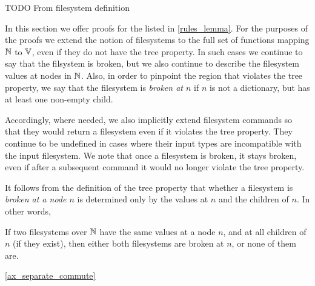 TODO From filesystem definition


In this section we offer proofs for the  listed in
\cref{rules_lemma}.
For the purposes of the proofs we extend the notion of filesystems 
to the full set of functions mapping $\mathbb{N}$ to $\mathbb{V}$, even if they
do not have the tree property.
In such cases we continue to say that the filsystem is broken,
but we also continue to describe the filesystem values at nodes in $\mathbb{N}$.
Also, in order to pinpoint the region that violates the tree property,
we say that the filesystem is \emph{broken at $n$} if 
$n$ is not a dictionary, but has at least one non-empty child.

Accordingly, where needed, we also implicitly extend filesystem commands
so that they would return a filesystem even if it violates the tree property.
They continue to be undefined in cases where their input types are incompatible
with the input filesystem.
We note that once a filesystem is broken, it stays broken, even if
after a subsequent command it would no longer violate the tree property.

It follows from the definition of the tree property that
whether a filesystem is \emph{broken at a node $n$} is determined only
by the values at $n$ and the children of $n$.
In other words,

\begin{myclm}
If two filesystems over $\mathbb{N}$ have the same values at a node $n$,
and at all children of $n$ (if they exist),
then either both filesystems are broken at $n$, or none of them are.
\end{myclm}

\cref{ax_separate_commute}

